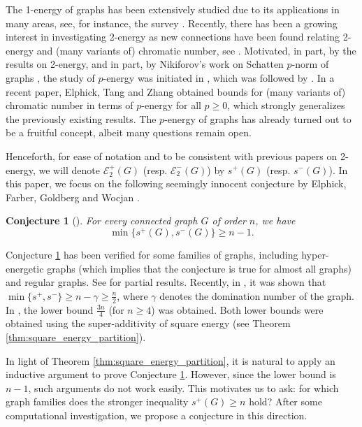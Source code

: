 \documentclass{article}
\newtheorem{conjecture}{Conjecture}[section]
\begin{document}
The 1-energy of graphs has been extensively studied due to its applications in many areas, see, for instance, the survey \cite{Gutman_2017_survey}. Recently, there has been a growing interest in investigating 2-energy as new connections have been found relating 2-energy and (many variants of) chromatic number, see \cite{Ando_Lin_2015, Coutinho2024conic, Guo_Spiro_2024}. Motivated, in part, by the results on 2-energy, and in part, by Nikiforov's work on Schatten $p$-norm of graphs \cite{Nikiforov_2012_ExtremalNorm, Nikiforov_2016_GraphEnergy}, the study of $p$-energy was initiated in \cite{Tang_Liu_Wang_2025_firstpaper_revised}, which was followed by \cite{Akbari_2025_p_energy, Tang_Liu_Wang_2025_p_energy}. In a recent paper, Elphick, Tang and Zhang \cite{Elphick_Tang_Zhang_2025} obtained bounds for (many variants of) chromatic number in terms of $p$-energy for all $p\ge 0$, which strongly generalizes the previously existing results. The $p$-energy of graphs has already turned out to be a fruitful concept, albeit many questions remain open.   

Henceforth, for ease of notation and to be consistent with previous papers on 2-energy, we will denote $\mathcal{E}_2^+(G)$ (resp. $\mathcal{E}_2^{-}(G)$) by $s^+(G)$ (resp. $s^{-}(G)$). In this paper, we focus on the following seemingly innocent conjecture by 
Elphick, Farber, Goldberg and Wocjan \cite{Elphick_FGW_2016}. 

\begin{conjecture}[\cite{Elphick_FGW_2016}] \label{conj:square_main}
For every connected graph $G$ of order $n$, we have
    \[ \min\{s^+(G), s^-(G)\}\ge n-1.\]
\end{conjecture}

Conjecture \ref{conj:square_main} has been verified for some families of graphs, including hyper-energetic graphs (which implies that the conjecture is true for almost all graphs) and regular graphs. See \cite{Aida_2023, Elphick_FGW_2016, Elphick_Linz_2024} for partial results. Recently, in \cite{Zhang_2024_Extremal}, it was shown that $\min\{s^+, s^-\}\ge n-\gamma \ge \frac{n}{2}$, where $\gamma$ denotes the domination number of the graph. In \cite{Akbari_2024_Linear}, the lower bound $\frac{3n}{4}$ (for $n\ge 4$) was obtained. Both lower bounds were obtained using the super-additivity of square energy (see Theorem \ref{thm:square_energy_partition}). 

In light of Theorem \ref{thm:square_energy_partition}, it is natural to apply an inductive argument to prove Conjecture \ref{conj:square_main}. However, since the lower bound is $n-1$, such arguments do not work easily. This motivates us to ask: for which graph families does the stronger inequality $s^+(G) \geq n$ hold? After some computational investigation, we propose a conjecture in this direction.
\end{document}
